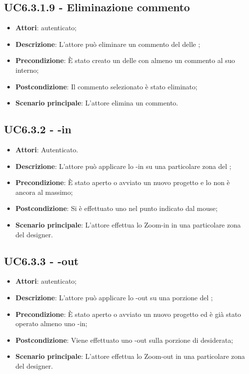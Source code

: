 \subsection{UC6.3.1.9 - Eliminazione commento}
\label{ssec:UC6.3.1.9}
\begin{itemize}
\item \textbf{Attori}:  autenticato;
\item \textbf{Descrizione}: L'attore può eliminare un commento del  delle ;
\item \textbf{Precondizione}: È stato creato un  delle  con almeno un commento al suo interno;
\item \textbf{Postcondizione}: Il commento selezionato è stato eliminato;
\item \textbf{Scenario principale}: L'attore elimina un commento.
\end{itemize}
\subsection{UC6.3.2 - -in}
\label{ssec:UC6.3.2}
\begin{itemize}
\item \textbf{Attori}:  Autenticato.
\item \textbf{Descrizione}: L'attore può applicare lo -in su una particolare zona del ;
\item \textbf{Precondizione}: È stato aperto o avviato un nuovo progetto e lo  non è ancora al massimo;
\item \textbf{Postcondizione}: Si è effettuato uno  nel punto indicato dal mouse;
\item \textbf{Scenario principale}: L'attore effettua lo Zoom-in in una particolare zona del designer.
\end{itemize}
\subsection{UC6.3.3 - -out}
\label{ssec:UC6.3.3}
\begin{itemize}
\item \textbf{Attori}:  autenticato;
\item \textbf{Descrizione}: L'attore può applicare lo -out su una porzione del ;
\item \textbf{Precondizione}: È stato aperto o avviato un nuovo progetto ed è già stato operato almeno uno -in;
\item \textbf{Postcondizione}: Viene effettuato uno -out sulla porzione di  desiderata;
\item \textbf{Scenario principale}: L'attore effettua lo Zoom-out in una particolare zona del designer.
\end{itemize}
